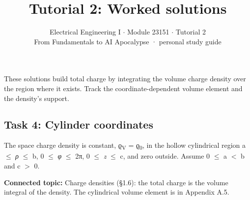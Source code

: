 \documentclass[11pt]{article}
\title{\sffamily\bfseries\color{FAUblue}Tutorial 2: Worked solutions}
\author{Electrical Engineering I \ensuremath{\cdot} Module 23151 \ensuremath{\cdot} Tutorial 2\\[2pt]\small From Fundamentals to AI Apocalypse · personal study guide}
\date{}
\begin{document}
\maketitle
\begingroup\footnotesize\setlength{\parskip}{0pt}\tableofcontents\endgroup
\clearpage

{\large These solutions build total charge by integrating the volume charge density over the region where it exists. Track the coordinate-dependent volume element and the density’s support.}


\begin{keepsection}
\section{Task 4: Cylinder coordinates}

The space charge density is constant, ϱ\textsubscript{V} = ϱ\textsubscript{0}, in the hollow cylindrical region a \ensuremath{\leq} \textit{ρ} \ensuremath{\leq} b, 0 \ensuremath{\leq} \textit{φ} \ensuremath{\leq} 2π, 0 \ensuremath{\leq} \textit{z} \ensuremath{\leq} c, and zero outside. Assume 0 \ensuremath{\leq} a \ensuremath{<} b and c \ensuremath{>} 0.

\textbf{Connected topic:} Charge densities (§1.6): the total charge is the volume integral of the density. The cylindrical volume element is in Appendix A.5.


\end{keepsection}
\end{document}

